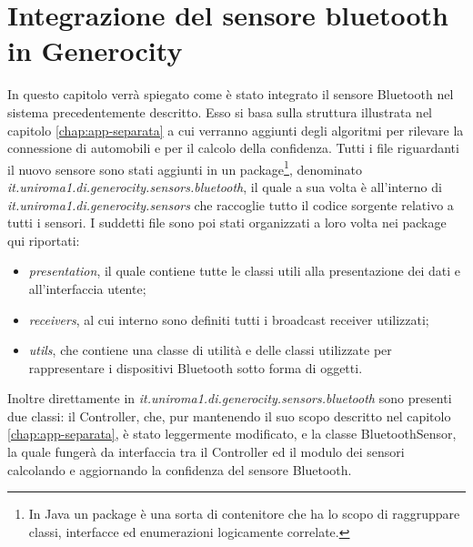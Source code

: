 \chapter{Integrazione del sensore bluetooth in Generocity} \label{chap:Bluetooth-sensor}
In questo capitolo verrà spiegato come è stato integrato il sensore Bluetooth nel sistema precedentemente descritto. Esso si basa sulla struttura illustrata nel capitolo \ref{chap:app-separata} a cui verranno aggiunti degli algoritmi per rilevare la connessione di automobili e per il calcolo della confidenza. Tutti i file riguardanti il nuovo sensore sono stati aggiunti in un package\footnote{In Java un package è una sorta di contenitore che ha lo scopo di raggruppare classi, interfacce ed enumerazioni logicamente correlate.}, denominato \textit{it.uniroma1.di.generocity.sensors.bluetooth}, il quale a sua volta è all'interno di \textit{it.uniroma1.di.generocity.sensors} che raccoglie tutto il codice sorgente relativo a tutti i sensori. I suddetti file sono poi stati organizzati a loro volta nei package qui riportati:
\begin{itemize}
    \item \textit{presentation}, il quale contiene tutte le classi utili alla presentazione dei dati e all'interfaccia utente;
    \item \textit{receivers}, al cui interno sono definiti tutti i broadcast receiver utilizzati;
    \item \textit{utils}, che contiene una classe di utilità e delle classi utilizzate per rappresentare i dispositivi Bluetooth sotto forma di oggetti.
\end{itemize}
Inoltre direttamente in \textit{it.uniroma1.di.generocity.sensors.bluetooth} sono presenti due classi: il Controller, che, pur mantenendo il suo scopo descritto nel capitolo \ref{chap:app-separata}, è stato leggermente modificato, e la classe BluetoothSensor, la quale fungerà da interfaccia tra il Controller ed il modulo dei sensori calcolando e aggiornando la confidenza del sensore Bluetooth.

